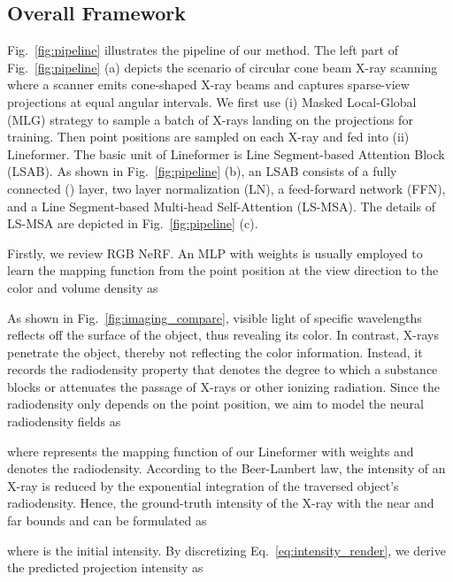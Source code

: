 \documentclass[10pt,twocolumn,letterpaper]{article}
\begin{document}
\subsection{Overall Framework}
Fig.~\ref{fig:pipeline} illustrates the pipeline of our method. The left part of  Fig.~\ref{fig:pipeline} (a) depicts the scenario of circular cone beam X-ray scanning where a scanner emits cone-shaped X-ray beams and captures sparse-view projections at equal angular intervals. We first use (i) Masked Local-Global (MLG) strategy to sample a batch of X-rays   landing on the projections for training. Then  point positions  are sampled on each X-ray  and fed into (ii) Lineformer. The basic unit of Lineformer is Line Segment-based  Attention Block (LSAB). As shown in Fig.~\ref{fig:pipeline} (b), an LSAB consists of a fully connected () layer, two layer normalization (LN), a feed-forward network (FFN), and a Line Segment-based Multi-head Self-Attention (LS-MSA). The details of LS-MSA are depicted in Fig.~\ref{fig:pipeline} (c). 

Firstly, we review RGB NeRF. An MLP with weights  is usually employed to learn the mapping function  from the point position  at the view direction   to the color  and volume density  as
\vspace{-0.7mm}

As shown in Fig.~\ref{fig:imaging_compare}, visible light of specific wavelengths reflects off the surface of the object, thus revealing its color. In contrast, X-rays penetrate the object, thereby not reflecting the color information. Instead, it records the radiodensity property that denotes the degree to which a substance blocks or attenuates the passage of X-rays or other ionizing radiation. Since the radiodensity only depends on the point position, we aim to model the neural radiodensity fields as
\vspace{-1.1mm}

where  represents the mapping function of our Lineformer with weights  and  denotes the radiodensity. According to the Beer-Lambert law, the intensity of an X-ray is reduced by the exponential integration of the traversed object's radiodensity. Hence, the ground-truth intensity   of the X-ray  with the near and far bounds  and  can be formulated as
\vspace{-0.7mm}

where  is the initial intensity. By discretizing Eq.~\eqref{eq:intensity_render}, we derive the predicted projection intensity  as
\vspace{-0.3mm}
\end{document}
